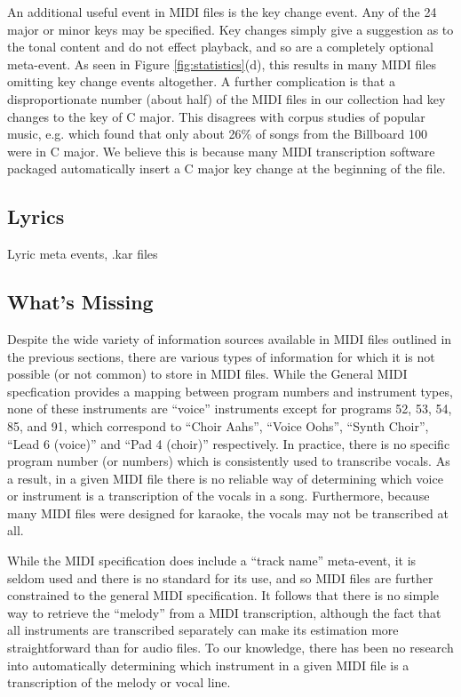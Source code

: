 \documentclass{article}
\begin{document}
An additional useful event in MIDI files is the key change event.
Any of the 24 major or minor keys may be specified.
Key changes simply give a suggestion as to the tonal content and do not effect playback, and so are a completely optional meta-event.
As seen in Figure \ref{fig:statistics}(d), this results in many MIDI files omitting key change events altogether.
A further complication is that a disproportionate number (about half) of the MIDI files in our collection had key changes to the key of C major.
This disagrees with corpus studies of popular music, e.g. \cite{carlton2012analyzed} which found that only about 26\% of songs from the Billboard 100 were in C major.
We believe this is because many MIDI transcription software packaged automatically insert a C major key change at the beginning of the file.

\subsection{Lyrics}

Lyric meta events, .kar files

\subsection{What's Missing}

Despite the wide variety of information sources available in MIDI files outlined in the previous sections, there are various types of information for which it is not possible (or not common) to store in MIDI files.
While the General MIDI specfication provides a mapping between program numbers and instrument types, none of these instruments are ``voice'' instruments except for programs 52, 53, 54, 85, and 91, which correspond to ``Choir Aahs'', ``Voice Oohs'', ``Synth Choir'', ``Lead 6 (voice)'' and ``Pad 4 (choir)'' respectively.
In practice, there is no specific program number (or numbers) which is consistently used to transcribe vocals.
As a result, in a given MIDI file there is no reliable way of determining which voice or instrument is a transcription of the vocals in a song.
Furthermore, because many MIDI files were designed for karaoke, the vocals may not be transcribed at all.

While the MIDI specification does include a ``track name'' meta-event, it is seldom used and there is no standard for its use, and so MIDI files are further constrained to the general MIDI specification.
It follows that there is no simple way to retrieve the ``melody'' from a MIDI transcription, although the fact that all instruments are transcribed separately can make its estimation more straightforward than for audio files.
To our knowledge, there has been no research into automatically determining which instrument in a given MIDI file is a transcription of the melody or vocal line.
\end{document}
